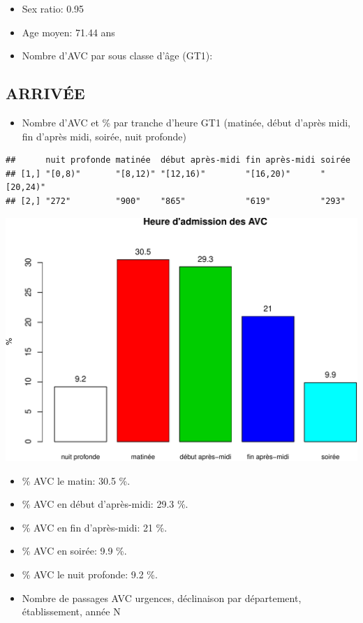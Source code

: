\documentclass[]{article}
\begin{document}
\begin{itemize}
\itemsep1pt\parskip0pt
\item
  Sex ratio: 0.95
\item
  Age moyen: 71.44 ans
\item
  Nombre d'AVC par sous classe d'âge (GT1):
\end{itemize}

\subsection{ARRIVÉE}\label{arrivee-2}

\begin{itemize}
\itemsep1pt\parskip0pt
\item
  Nombre d'AVC et \% par tranche d'heure GT1 (matinée, début d'après
  midi, fin d'après midi, soirée, nuit profonde)
\end{itemize}

\begin{verbatim}
##      nuit profonde matinée  début après-midi fin après-midi soirée   
## [1,] "[0,8)"       "[8,12)" "[12,16)"        "[16,20)"      "[20,24)"
## [2,] "272"         "900"    "865"            "619"          "293"
\end{verbatim}

\includegraphics{rapport2014_V4_files/figure-latex/avc_periode-1.pdf}

\begin{itemize}
\item
  \% AVC le matin: 30.5 \%.
\item
  \% AVC en début d'après-midi: 29.3 \%.
\item
  \% AVC en fin d'après-midi: 21 \%.
\item
  \% AVC en soirée: 9.9 \%.
\item
  \% AVC le nuit profonde: 9.2 \%.
\item
  Nombre de passages AVC urgences, déclinaison par département,
  établissement, année N
\end{itemize}
\end{document}
